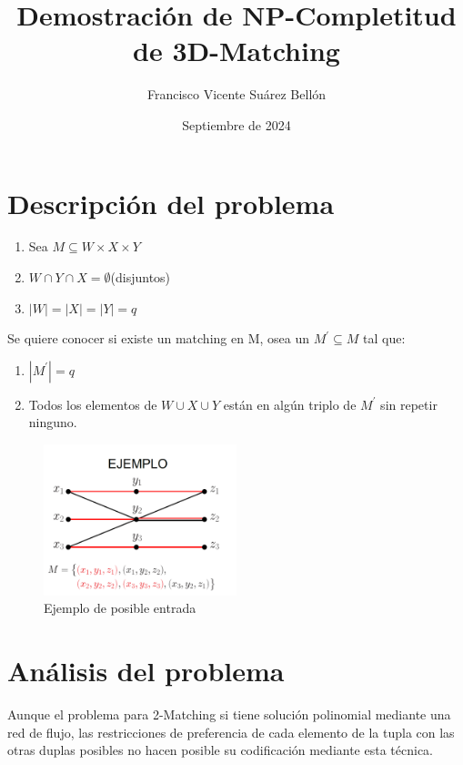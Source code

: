 \documentclass{article}
\title{Demostración de NP-Completitud de 3D-Matching}
\author{Francisco Vicente Suárez Bellón}
\date{Septiembre de 2024}
\begin{document}
\maketitle
\newpage
\tableofcontents %
\newpage

\section{Descripción del problema}
\begin{enumerate}
    \item Sea $M \subseteq  W \times  X \times Y$
    \item $W \cap Y \cap X = \emptyset $(disjuntos)
    \item $|W|=|X|=|Y|=q$
    
\end{enumerate}
Se quiere conocer si existe un matching en M, osea un $M^{'}\subseteq M$ tal que:
\begin{enumerate}
    \item $|M^{'}|=q$
    \item Todos los elementos de $W \cup X \cup Y$ están en algún triplo de $M^{'}$ sin repetir ninguno.
\end{enumerate}

\begin{figure}[H]
    \centering
    \includegraphics[width=0.5\textwidth]{photos/3_DM_example_1.png}
    \caption{Ejemplo de posible entrada}
    \label{fig:etiqueta}
\end{figure}


\newpage
\section{Análisis del problema}
Aunque el problema para 2-Matching si tiene solución polinomial mediante una red de flujo,
las restricciones de preferencia de cada elemento de la tupla con las otras duplas posibles no hacen posible su codificación mediante esta técnica.
\end{document}
